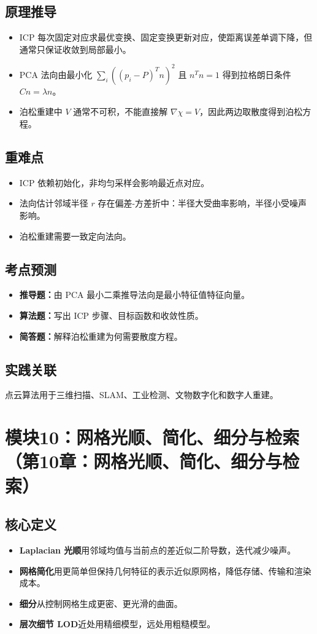 \documentclass[UTF8,fontset=fandol,11pt]{ctexart}
\newcommand{\key}[1]{\textbf{#1}}
\newcommand{\exam}[1]{\textcolor{blue!55!black}{\textbf{#1}}}
\begin{document}
\subsection{原理推导}
\begin{itemize}
  \item ICP 每次固定对应求最优变换、固定变换更新对应，使距离误差单调下降，但通常只保证收敛到局部最小。
  \item PCA 法向由最小化 $\sum_i((p_i-P)^Tn)^2$ 且 $n^Tn=1$ 得到拉格朗日条件 $Cn=\lambda n$。
  \item 泊松重建中 $V$ 通常不可积，不能直接解 $\nabla\chi=V$，因此两边取散度得到泊松方程。
\end{itemize}
\subsection{重难点}
\begin{itemize}
  \item ICP 依赖初始化，非均匀采样会影响最近点对应。
  \item 法向估计邻域半径 $r$ 存在偏差-方差折中：半径大受曲率影响，半径小受噪声影响。
  \item 泊松重建需要一致定向法向。
\end{itemize}
\subsection{考点预测}
\begin{itemize}
  \item \exam{推导题：}由 PCA 最小二乘推导法向是最小特征值特征向量。
  \item \exam{算法题：}写出 ICP 步骤、目标函数和收敛性质。
  \item \exam{简答题：}解释泊松重建为何需要散度方程。
\end{itemize}
\subsection{实践关联}
点云算法用于三维扫描、SLAM、工业检测、文物数字化和数字人重建。

\section{模块10：网格光顺、简化、细分与检索（第10章：网格光顺、简化、细分与检索）}
\subsection{核心定义}
\begin{itemize}
  \item \key{Laplacian 光顺}用邻域均值与当前点的差近似二阶导数，迭代减少噪声。
  \item \key{网格简化}用更简单但保持几何特征的表示近似原网格，降低存储、传输和渲染成本。
  \item \key{细分}从控制网格生成更密、更光滑的曲面。
  \item \key{层次细节 LOD}近处用精细模型，远处用粗糙模型。
\end{itemize}
\end{document}
